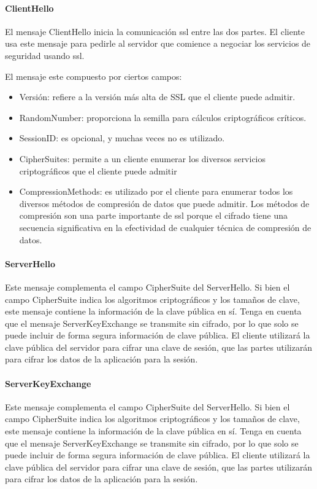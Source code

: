 \paragraph*{ClientHello}
El mensaje ClientHello inicia la comunicación ssl entre las dos partes. 
El cliente usa este mensaje para pedirle al servidor que comience a 
negociar los servicios de seguridad usando ssl.

El mensaje este compuesto por ciertos campos: 
\begin{itemize}
   \item Versión: refiere a la versión más alta de SSL que el cliente 
   puede admitir. 
   \item RandomNumber: proporciona la semilla para cálculos criptográficos
   críticos. 
   \item SessionID: es opcional, y muchas veces no es utilizado. 
   \item CipherSuites: permite a un cliente enumerar los diversos 
   servicios criptográficos que el cliente puede admitir
   \item CompressionMethods: es utilizado por el cliente para enumerar 
   todos los diversos métodos de compresión de datos que puede admitir.
    Los métodos de compresión son una parte importante de ssl porque el 
    cifrado tiene una secuencia significativa en la efectividad de 
    cualquier técnica de compresión de datos. 
\end{itemize}


\paragraph*{ServerHello}
Este mensaje complementa el campo CipherSuite del ServerHello. Si bien 
el campo CipherSuite indica los algoritmos criptográficos y los tamaños 
de clave, este mensaje contiene la información de la clave pública en sí. 
Tenga en cuenta que el mensaje ServerKeyExchange se transmite sin cifrado, 
por lo que solo se puede incluir de forma segura información de clave 
pública. El cliente utilizará la clave pública del servidor para cifrar 
una clave de sesión, que las partes utilizarán para cifrar los datos de 
la aplicación para la sesión.

\paragraph*{ServerKeyExchange}

Este mensaje complementa el campo CipherSuite del ServerHello. 
Si bien el campo CipherSuite indica los algoritmos criptográficos y 
los tamaños de clave, este mensaje contiene la información de la clave 
pública en sí. Tenga en cuenta que el mensaje ServerKeyExchange se 
transmite sin cifrado, por lo que solo se puede incluir de forma 
segura información de clave pública. El cliente utilizará la clave 
pública del servidor para cifrar una clave de sesión, que las partes 
utilizarán para cifrar los datos de la aplicación para la sesión.

